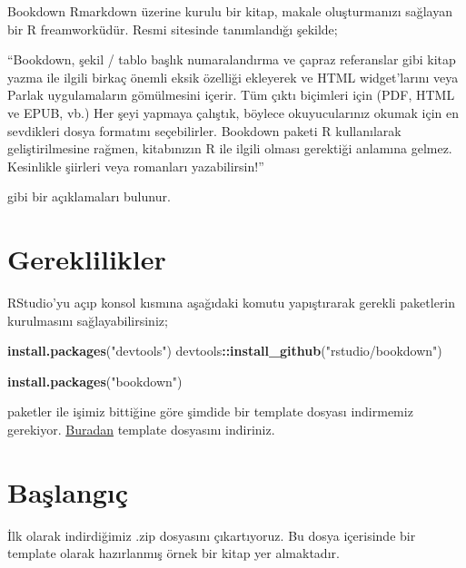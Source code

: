 \documentclass[]{book}
\newenvironment{Shaded}{\begin{snugshade}}{\end{snugshade}}
\newcommand{\KeywordTok}[1]{\textcolor[rgb]{0.13,0.29,0.53}{\textbf{#1}}}
\newcommand{\StringTok}[1]{\textcolor[rgb]{0.31,0.60,0.02}{#1}}
\newcommand{\OperatorTok}[1]{\textcolor[rgb]{0.81,0.36,0.00}{\textbf{#1}}}
\newcommand{\NormalTok}[1]{#1}
\begin{document}
Bookdown Rmarkdown üzerine kurulu bir kitap, makale oluşturmanızı
sağlayan bir R freamworküdür. Resmi sitesinde tanımlandığı şekilde;

``Bookdown, şekil / tablo başlık numaralandırma ve çapraz referanslar
gibi kitap yazma ile ilgili birkaç önemli eksik özelliği ekleyerek ve
HTML widget'larını veya Parlak uygulamaların gömülmesini içerir. Tüm
çıktı biçimleri için (PDF, HTML ve EPUB, vb.) Her şeyi yapmaya çalıştık,
böylece okuyucularınız okumak için en sevdikleri dosya formatını
seçebilirler. Bookdown paketi R kullanılarak geliştirilmesine rağmen,
kitabınızın R ile ilgili olması gerektiği anlamına gelmez. Kesinlikle
şiirleri veya romanları yazabilirsin!''

gibi bir açıklamaları bulunur.

\section{Gereklilikler}\label{gereklilikler-1}

RStudio'yu açıp konsol kısmına aşağıdaki komutu yapıştırarak gerekli
paketlerin kurulmasını sağlayabilirsiniz;

\begin{Shaded}
\begin{Highlighting}[]
\KeywordTok{install.packages}\NormalTok{(}\StringTok{"devtools"}\NormalTok{)}
\NormalTok{  devtools}\OperatorTok{::}\KeywordTok{install_github}\NormalTok{(}\StringTok{"rstudio/bookdown"}\NormalTok{)}
\end{Highlighting}
\end{Shaded}

\begin{Shaded}
\begin{Highlighting}[]
\KeywordTok{install.packages}\NormalTok{(}\StringTok{"bookdown"}\NormalTok{)}
\end{Highlighting}
\end{Shaded}

paketler ile işimiz bittiğine göre şimdide bir template dosyası
indirmemiz gerekiyor.
\href{https://github.com/rstudio/bookdown-demo}{Buradan} template
dosyasını indiriniz.

\section{Başlangıç}\label{baslangc}

İlk olarak indirdiğimiz .zip dosyasını çıkartıyoruz. Bu dosya içerisinde
bir template olarak hazırlanmış örnek bir kitap yer almaktadır.
\end{document}
